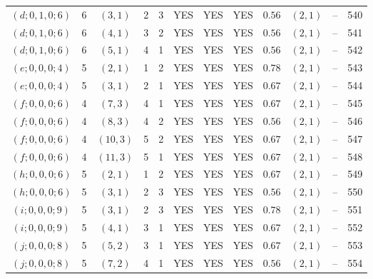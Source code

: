 \begin{longtable}{|c|c|c|c|c|c|c|c|c|c|c|c|}
$(d;0,1,0;6)$ & 6 & $(3,1)$ & 2 & 3 & YES & YES & YES & $0.56$ & $(2,1)$ & -- & 540\\
$(d;0,1,0;6)$ & 6 & $(4,1)$ & 3 & 2 & YES & YES & YES & $0.56$ & $(2,1)$ & -- & 541\\
$(d;0,1,0;6)$ & 6 & $(5,1)$ & 4 & 1 & YES & YES & YES & $0.56$ & $(2,1)$ & -- & 542\\
$(e;0,0,0;4)$ & 5 & $(2,1)$ & 1 & 2 & YES & YES & YES & $0.78$ & $(2,1)$ & -- & 543\\
$(e;0,0,0;4)$ & 5 & $(3,1)$ & 2 & 1 & YES & YES & YES & $0.67$ & $(2,1)$ & -- & 544\\
$(f;0,0,0;6)$ & 4 & $(7,3)$ & 4 & 1 & YES & YES & YES & $0.67$ & $(2,1)$ & -- & 545\\
$(f;0,0,0;6)$ & 4 & $(8,3)$ & 4 & 2 & YES & YES & YES & $0.56$ & $(2,1)$ & -- & 546\\
$(f;0,0,0;6)$ & 4 & $(10,3)$ & 5 & 2 & YES & YES & YES & $0.67$ & $(2,1)$ & -- & 547\\
$(f;0,0,0;6)$ & 4 & $(11,3)$ & 5 & 1 & YES & YES & YES & $0.67$ & $(2,1)$ & -- & 548\\
$(h;0,0,0;6)$ & 5 & $(2,1)$ & 1 & 2 & YES & YES & YES & $0.67$ & $(2,1)$ & -- & 549\\
$(h;0,0,0;6)$ & 5 & $(3,1)$ & 2 & 3 & YES & YES & YES & $0.56$ & $(2,1)$ & -- & 550\\
$(i;0,0,0;9)$ & 5 & $(3,1)$ & 2 & 3 & YES & YES & YES & $0.78$ & $(2,1)$ & -- & 551\\
$(i;0,0,0;9)$ & 5 & $(4,1)$ & 3 & 1 & YES & YES & YES & $0.67$ & $(2,1)$ & -- & 552\\
$(j;0,0,0;8)$ & 5 & $(5,2)$ & 3 & 1 & YES & YES & YES & $0.67$ & $(2,1)$ & -- & 553\\
$(j;0,0,0;8)$ & 5 & $(7,2)$ & 4 & 1 & YES & YES & YES & $0.56$ & $(2,1)$ & -- & 554
\end{longtable}
